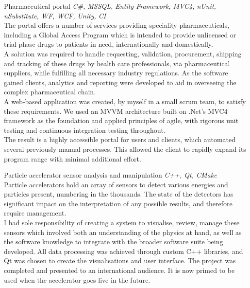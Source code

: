 \documentclass[]{friggeri-cv} %
\begin{document}
\begin{projectentrylist}
\projectentry
{Pharmaceutical portal}
{\emph{C\#, MSSQL, Entity Framework, MVC4, nUnit, nSubstitute, WF, WCF, Unity, CI} \\
The portal offers a number of services providing speciality pharmaceuticals, including
a Global Access Program which is intended to provide unlicensed or trial-phase drugs
to patients in need, internationally and domestically.\\
A solution was required to handle
requesting, validation, procurement, shipping and tracking of these drugs by health care
professionals, via pharmaceutical suppliers, while fulfilling all necessary industry regulations. As the software gained clients, analytics and reporting were developed
to aid in overseeing the complex pharmaceutical chain. \\
A web-based application was created, by myself in a small scrum team, to satisfy these
requirements. We used an MVVM architecture built on .Net’s MVC4 framework as the foundation and applied principles of agile, with rigorous unit testing and continuous integration testing throughout. \\
The result is a highly accessible portal for users and clients, which automated several previously manual processes. This allowed the client to rapidly expand
its program range with minimal additional effort.}


\projectentry
{Particle accelerator sensor analysis and manipulation}
{\emph{C++, Qt, CMake}\\
Particle accelerators hold an array of sensors to detect various energies and particles present, numbering in the thousands. The state of the detectors has significant impact on the interpretation of any possible results, and therefore require management. \\
I had sole responsibility of creating a system to visualise, review, manage these sensors which involved both an understanding of the physics at hand, as well as the software knowledge to integrate with the broader software suite being developed. All data processing was achieved through custom C++ libraries, and Qt was chosen to create the visualisations and user interface. 
The project was completed and presented to an international audience. It is now primed to be used when the accelerator goes live in the future. }


\end{projectentrylist}
\end{document}
